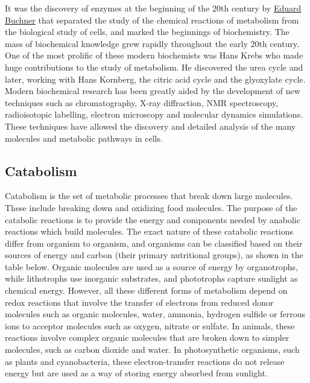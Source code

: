 It was the discovery of enzymes at the beginning of the 20th century by \href{https://en.wikipedia.org/wiki/Eduard_Buchner}{Eduard Buchner} that separated the study of the chemical reactions of metabolism from the biological study of cells, and marked the beginnings of biochemistry. The mass of biochemical knowledge grew rapidly throughout the early 20th century. One of the most prolific of these modern biochemists was Hans Krebs who made huge contributions to the study of metabolism. He discovered the urea cycle and later, working with Hans Kornberg, the citric acid cycle and the glyoxylate cycle. Modern biochemical research has been greatly aided by the development of new techniques such as chromatography, X-ray diffraction, NMR spectroscopy, radioisotopic labelling, electron microscopy and molecular dynamics simulations. These techniques have allowed the discovery and detailed analysis of the many molecules and metabolic pathways in cells.

\hypertarget{catabolism}{%
\subsection{Catabolism}\label{catabolism}}

Catabolism is the set of metabolic processes that break down large molecules. These include breaking down and oxidizing food molecules. The purpose of the catabolic reactions is to provide the energy and components needed by anabolic reactions which build molecules. The exact nature of these catabolic reactions differ from organism to organism, and organisms can be classified based on their sources of energy and carbon (their primary nutritional groups), as shown in the table below. Organic molecules are used as a source of energy by organotrophs, while lithotrophs use inorganic substrates, and phototrophs capture sunlight as chemical energy. However, all these different forms of metabolism depend on redox reactions that involve the transfer of electrons from reduced donor molecules such as organic molecules, water, ammonia, hydrogen sulfide or ferrous ions to acceptor molecules such as oxygen, nitrate or sulfate. In animals, these reactions involve complex organic molecules that are broken down to simpler molecules, such as carbon dioxide and water. In photosynthetic organisms, such as plants and cyanobacteria, these electron-transfer reactions do not release energy but are used as a way of storing energy absorbed from sunlight.



